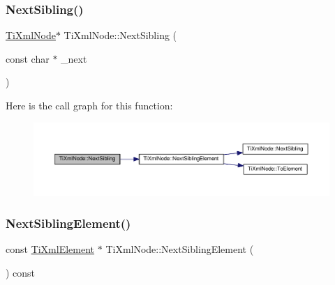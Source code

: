 \subsubsection{\texorpdfstring{Next\+Sibling()}{NextSibling()}\hspace{0.1cm}{\footnotesize\ttfamily [4/4]}}
{\footnotesize\ttfamily \hyperlink{class_ti_xml_node}{Ti\+Xml\+Node}$\ast$ Ti\+Xml\+Node\+::\+Next\+Sibling (\begin{DoxyParamCaption}\item[{const char $\ast$}]{\+\_\+next }\end{DoxyParamCaption})\hspace{0.3cm}{\ttfamily [inline]}}

Here is the call graph for this function\+:\nopagebreak
\begin{figure}[H]
\begin{center}
\leavevmode
\includegraphics[width=350pt]{class_ti_xml_node_a4080bc5cc8a5c139e7cf308669e850fc_cgraph}
\end{center}
\end{figure}
\mbox{\label{class_ti_xml_node_ac6105781c913a42aa7f3f17bd1964f7c}} 
\subsubsection{\texorpdfstring{Next\+Sibling\+Element()}{NextSiblingElement()}\hspace{0.1cm}{\footnotesize\ttfamily [1/4]}}
{\footnotesize\ttfamily const \hyperlink{class_ti_xml_element}{Ti\+Xml\+Element} $\ast$ Ti\+Xml\+Node\+::\+Next\+Sibling\+Element (\begin{DoxyParamCaption}{ }\end{DoxyParamCaption}) const}

